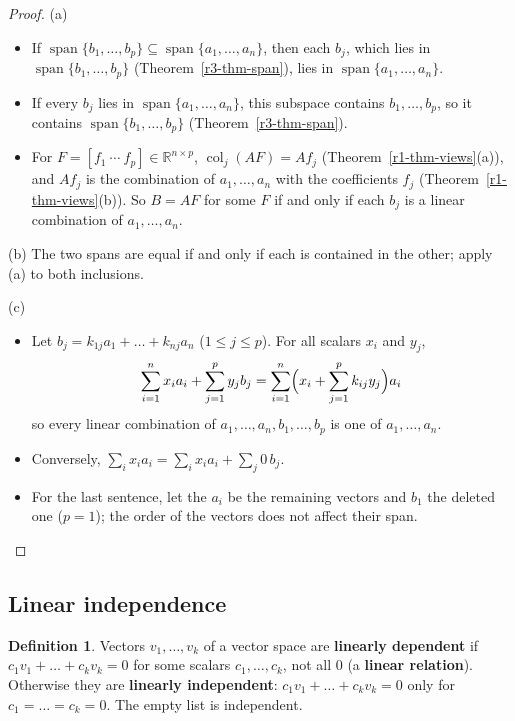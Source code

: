 \documentclass[12pt]{article}
\newcommand{\R}{\mathbb R}
\DeclareMathOperator{\col}{col}
\DeclareMathOperator{\Span}{span}
\theoremstyle{definition}
\newtheorem{definition}[theorem]{Definition}
\begin{document}
\begin{proof}
(a)
\begin{itemize}
\item If \(\Span\{b_1,\dots,b_p\}\subseteq\Span\{a_1,\dots,a_n\}\), then each \(b_j\), which lies in
\(\Span\{b_1,\dots,b_p\}\) (Theorem~\ref{r3-thm-span}), lies in \(\Span\{a_1,\dots,a_n\}\).
\item If every \(b_j\) lies in \(\Span\{a_1,\dots,a_n\}\), this subspace contains \(b_1,\dots,b_p\), so it
contains \(\Span\{b_1,\dots,b_p\}\) (Theorem~\ref{r3-thm-span}).
\item For \(F=[f_1\ \cdots\ f_p]\in\R^{n\times p}\), \(\col_j(AF)=Af_j\) (Theorem~\ref{r1-thm-views}(a)), and
\(Af_j\) is the combination of \(a_1,\dots,a_n\) with the coefficients \(f_j\) (Theorem~\ref{r1-thm-views}(b)).
So \(B=AF\) for some \(F\) if and only if each \(b_j\) is a linear combination of \(a_1,\dots,a_n\).
\end{itemize}
(b) The two spans are equal if and only if each is contained in the other; apply (a) to both
inclusions.

(c)
\begin{itemize}
\item Let \(b_j=k_{1j}a_1+\dots+k_{nj}a_n\) (\(1\leqslant j\leqslant p\)). For all scalars \(x_i\) and
\(y_j\),
\[
\sum_{i=1}^nx_ia_i+\sum_{j=1}^py_jb_j=\sum_{i=1}^n\Bigl(x_i+\sum_{j=1}^pk_{ij}y_j\Bigr)a_i
\]
so every linear combination of \(a_1,\dots,a_n,b_1,\dots,b_p\) is one of \(a_1,\dots,a_n\).
\item Conversely, \(\sum_ix_ia_i=\sum_ix_ia_i+\sum_j0\,b_j\).
\item For the last sentence, let the \(a_i\) be the remaining vectors and \(b_1\) the deleted one
(\(p=1\)); the order of the vectors does not affect their span.\qedhere
\end{itemize}
\end{proof}

\subsection*{Linear independence}

\begin{definition}\label{r3-def-independence}
Vectors \(v_1,\dots,v_k\) of a vector space are \textbf{linearly dependent} if
\(c_1v_1+\dots+c_kv_k=0\) for some scalars \(c_1,\dots,c_k\), not all \(0\) (a \textbf{linear
relation}). Otherwise they are \textbf{linearly independent}: \(c_1v_1+\dots+c_kv_k=0\) only
for \(c_1=\dots=c_k=0\). The empty list is independent.
\end{definition}
\end{document}
